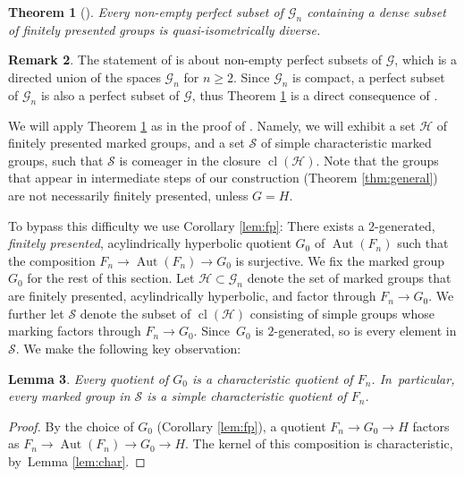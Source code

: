 \documentclass[11pt]{article}
\newtheorem{theorem}{Theorem}[section]
\newtheorem{lemma}[theorem]{Lemma}
\theoremstyle{definition}
\newtheorem{remark}[theorem]{Remark}
\newcommand{\Aut}{\operatorname{Aut}}
\newcommand{\cl}{\operatorname{cl}}
\newcommand{\Gn}{\mathcal{G}_n}
\begin{document}
\begin{theorem}[{\cite[Cor.\,1.2]{diversity}}]
\label{thm:diversity:criterion}
Every non-empty perfect subset of $\Gn$ containing a dense subset of finitely presented groups is quasi-isometrically diverse.
\end{theorem}

\begin{remark}
The statement of \cite[Cor.\,1.2]{diversity} is about non-empty perfect subsets of $\mathcal{G}$, which is a directed union of the spaces $\Gn$ for $n \geq 2$. Since $\Gn$ is compact, a perfect subset of $\Gn$ is also a perfect subset of $\mathcal{G}$, thus Theorem \ref{thm:diversity:criterion} is a direct consequence of \cite[Cor.\,1.2]{diversity}.
\end{remark}

We will apply Theorem \ref{thm:diversity:criterion} as in the proof of \cite[Cor.\,4.10]{diversity}. Namely, we will exhibit a set $\mathcal{H}$ of finitely presented marked groups, and a set $\mathcal{S}$ of simple characteristic marked groups, such that $\mathcal{S}$ is comeager in the closure $\cl(\mathcal{H})$.
Note that the groups that appear in intermediate steps of our construction (Theorem \ref{thm:general}) are not necessarily finitely presented, unless $G = H$.

To bypass this difficulty we use Corollary \ref{lem:fp}: There exists a $2$-generated, \emph{finitely presented}, acylindrically hyperbolic quotient $G_0$ of $\Aut(F_n)$ such that the composition $F_n \to \Aut(F_n) \to G_0$ is surjective.
We fix the marked group $G_0$ for the rest of this section. Let $\mathcal{H} \subset \Gn$ denote the set of marked groups that are finitely presented, acylindrically hyperbolic, and factor through $F_n \to G_0$.
We further let $\mathcal{S}$ denote the subset of $\cl(\mathcal{H})$ consisting of simple groups whose marking factors through \hbox{$F_n \!\to\! G_0$}.
Since~$G_0$ is $2$-generated, so is every element in $\mathcal S$.
We make the following key observation:

\begin{lemma}
\label{lem:factor:char}
Every quotient of $G_0$ is a characteristic quotient of $F_n$. In~particular, every marked group in $\mathcal{S}$ is a simple characteristic quotient of $F_n$.
\end{lemma}

\begin{proof}
By the choice of $G_0$ (Corollary \ref{lem:fp}), a quotient $F_n \to G_0 \to H$ factors as $F_n \to \Aut(F_n) \to G_0 \to H$. The kernel of this composition is characteristic, by~Lemma \ref{lem:char}.
\end{proof}
\end{document}
